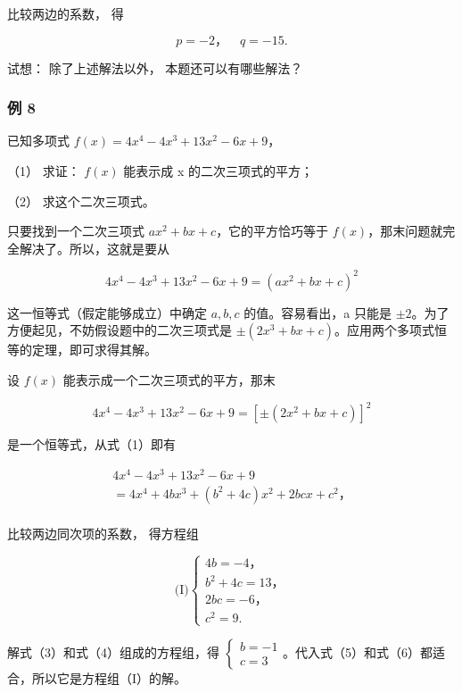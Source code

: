 比较两边的系数， 得

\[
p = - 2\text{，} \quad q = - 15.
\]

试想： 除了上述解法以外， 本题还可以有哪些解法？

\subsubsection{例 8}

已知多项式 \(f(x) = 4x^4 - 4x^3 + 13x^2 - 6x + 9\)，

（1） 求证： \(f(x)\) 能表示成 x 的二次三项式的平方；

（2） 求这个二次三项式。

 只要找到一个二次三项式
\(ax^2 + bx + c\)，它的平方恰巧等于
\(f(x)\)，那末问题就完全解决了。所以，这就是要从

\[
4 x ^ {4} - 4 x ^ {3} + 13 x ^ {2} - 6 x + 9 = (a x ^ {2} + b x + c) ^ {2}
\]

这一恒等式（假定能够成立）中确定 \(a, b, c\) 的值。容易看出，a 只能是
\(\pm2\)。为了方便起见，不妨假设题中的二次三项式是
\(\pm(2x^{3}+bx+c)\)。应用两个多项式恒等的定理，即可求得其解。

 设 \(f(x)\) 能表示成一个二次三项式的平方，那末

\[
4 x ^ {4} - 4 x ^ {3} + 13 x ^ {2} - 6 x + 9 = [ \pm (2 x ^ {2} + b x + c) ] ^ {2} \tag {1}
\]

是一个恒等式，从式（1）即有

\[
\begin{array}{l} 4 x ^ {4} - 4 x ^ {3} + 13 x ^ {2} - 6 x + 9 \\ = 4 x ^ {4} + 4 b x ^ {3} + (b ^ {2} + 4 c) x ^ {2} + 2 b c x + c ^ {2}\text{，} \tag {2} \\ \end{array}
\]

比较两边同次项的系数， 得方程组

\[
\text {(I)} \left\{ \begin{array}{c} 4 b = - 4\text{，} \\ b ^ {2} + 4 c = 13\text{，} \\ 2 b c = - 6\text{，} \\ c ^ {2} = 9. \end{array} \right. \tag {3}
\]

解式（3）和式（4）组成的方程组，得
\(\left\{ \begin{array}{l} b = -1 \\ c = 3 \end{array} \right.\)。代入式（5）和式（6）都适合，所以它是方程组（I）的解。

